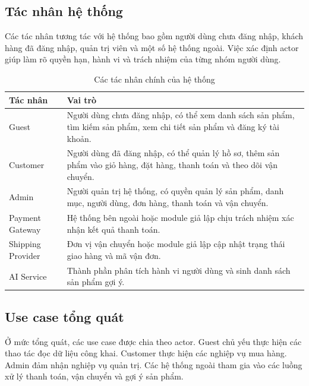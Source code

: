 \documentclass[../main.tex]{subfiles}
\begin{document}
\subsection{Tác nhân hệ thống}
\label{subsection:2.1.3}

Các tác nhân tương tác với hệ thống bao gồm người dùng chưa đăng nhập, khách hàng đã đăng nhập, quản trị viên và một số hệ thống ngoài. Việc xác định actor giúp làm rõ quyền hạn, hành vi và trách nhiệm của từng nhóm người dùng.

\begin{table}[H]
    \centering
    \caption{Các tác nhân chính của hệ thống}
    \label{tab:chapter2-actors}
    \begin{tabular}{|p{}|p{}|}
        \hline
        \rowcolor{primary!35}
        \textbf{Tác nhân} & \textbf{Vai trò} \\
        \hline
        Guest & Người dùng chưa đăng nhập, có thể xem danh sách sản phẩm, tìm kiếm sản phẩm, xem chi tiết sản phẩm và đăng ký tài khoản. \\
        \hline
        Customer & Người dùng đã đăng nhập, có thể quản lý hồ sơ, thêm sản phẩm vào giỏ hàng, đặt hàng, thanh toán và theo dõi vận chuyển. \\
        \hline
        Admin & Người quản trị hệ thống, có quyền quản lý sản phẩm, danh mục, người dùng, đơn hàng, thanh toán và vận chuyển. \\
        \hline
        Payment Gateway & Hệ thống bên ngoài hoặc module giả lập chịu trách nhiệm xác nhận kết quả thanh toán. \\
        \hline
        Shipping Provider & Đơn vị vận chuyển hoặc module giả lập cập nhật trạng thái giao hàng và mã vận đơn. \\
        \hline
        AI Service & Thành phần phân tích hành vi người dùng và sinh danh sách sản phẩm gợi ý. \\
        \hline
    \end{tabular}
\end{table}

\subsection{Use case tổng quát}
\label{subsection:2.1.4}

Ở mức tổng quát, các use case được chia theo actor. Guest chủ yếu thực hiện các thao tác đọc dữ liệu công khai. Customer thực hiện các nghiệp vụ mua hàng. Admin đảm nhận nghiệp vụ quản trị. Các hệ thống ngoài tham gia vào các luồng xử lý thanh toán, vận chuyển và gợi ý sản phẩm.
\end{document}
